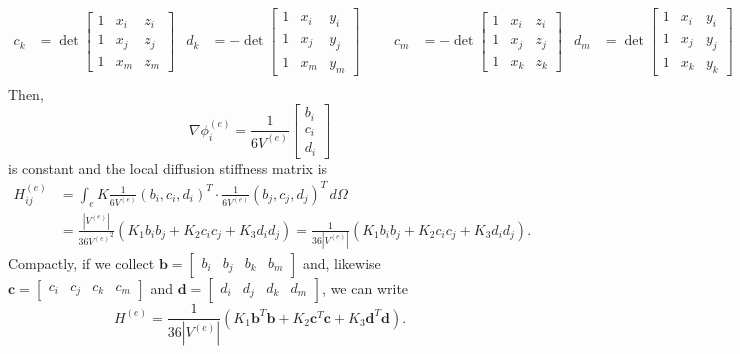 \documentclass[hidelinks]{article}
\begin{document}
\begin{align*}
c_k &= \det \begin{bmatrix} 1 & x_i & z_i \\ 1 & x_j & z_j \\ 1 & x_m & z_m \end{bmatrix}& d_k &= - \det \begin{bmatrix} 1 & x_i & y_i \\ 1 & x_j & y_j \\ 1 & x_m & y_m \end{bmatrix}     & & & c_m &= - \det \begin{bmatrix} 1 & x_i & z_i \\ 1 & x_j & z_j \\ 1 & x_k & z_k \end{bmatrix}& d_m &=\det \begin{bmatrix} 1 & x_i & y_i \\ 1 & x_j & y_j \\ 1 & x_k & y_k \end{bmatrix}\\
\end{align*}
Then, \[\nabla \phi_i^{(e)} = \frac{1}{6V^{(e)}}\begin{bmatrix}
    b_i \\ c_i \\ d_i
\end{bmatrix} \] is constant and the local diffusion stiffness matrix is 
\begin{align*}
H_{ij}^{(e)} &= \int_e K \frac{1}{6V^{(e)}}(b_i, c_i, d_i)^T \cdot \frac{1}{6V^{(e)}}(b_j, c_j, d_j)^T \,d\Omega \\ &= \frac{|V^{(e)}|}{{36V^{(e)}}^2} (K_1b_ib_j + K_2c_ic_j + K_3d_id_j) = \frac{1}{36|V^{(e)}|} (K_1b_ib_j + K_2c_ic_j + K_3d_id_j).
\end{align*}
Compactly, if we collect $\mathbf{b} = \begin{bmatrix} b_i & b_j & b_k & b_m\end{bmatrix}$ and, likewise $\mathbf{c} = \begin{bmatrix} c_i & c_j & c_k & c_m\end{bmatrix}$ and $\mathbf{d} = \begin{bmatrix} d_i & d_j & d_k & d_m \end{bmatrix}$, we can write 
\[ H^{(e)} = \frac{1}{36|V^{(e)}|}(K_1\mathbf{b}^T\mathbf{b} + K_2\mathbf{c}^T\mathbf{c} +  K_3\mathbf{d}^T\mathbf{d}).
\]
\end{document}
